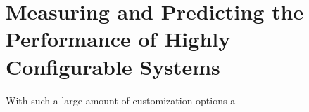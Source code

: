 \section{Measuring and Predicting the Performance of Highly Configurable Systems}

With such a large amount of customization options a 
